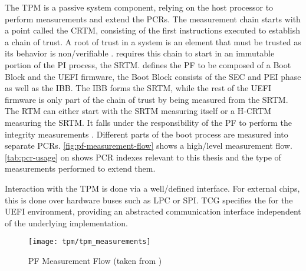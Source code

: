 The \ac{TPM} is a passive system component, relying on the host processor to perform measurements and extend the \acp{PCR}.
The measurement chain starts with a point called the \ac{CRTM}, consisting of the first instructions executed to establish a chain of trust.
A root of trust in a system is an element that must be trusted as its behavior is non\-/verifiable \cite{tcg-tpm-library-part1-architecture}.
\cite[3.2.2]{tcg-pc-client-platform-firmware-profile-spec} requires this chain to start in an immutable portion of the \ac{PI} process, the \ac{SRTM}.
\cite[3.2.3.1]{tcg-pc-client-platform-firmware-profile-spec} defines the \ac{PF} to be composed of a Boot Block and the \ac{UEFI} firmware, the Boot Block consists of the \ac{SEC} and \ac{PEI} phase as well as the \ac{IBB}.
The \ac{IBB} forms the \ac{SRTM}, while the rest of the \ac{UEFI} firmware is only part of the chain of trust by being measured from the \ac{SRTM}.
The \ac{RTM} can either start with the \ac{SRTM} measuring itself or a \ac{H-CRTM} measuring the \ac{SRTM}.
It falls under the responsibility of the \ac{PF} to perform the integrity measurements \cite{tcg-pc-client-platform-firmware-profile-spec}.
Different parts of the boot process are measured into separate \acp{PCR}.
\autoref{fig:pf-measurement-flow} shows a high\-/level measurement flow.
\autoref{tab:pcr-usage} on \pageref{tab:pcr-usage} shows \ac{PCR} indexes relevant to this thesis and the type of measurements performed to extend them.

Interaction with the \ac{TPM} is done via a well\-/defined interface.
For external chips, this is done over hardware buses such as \ac{LPC} or \ac{SPI}.
\ac{TCG} specifies the  for the \ac{UEFI} environment, providing an abstracted communication interface independent of the underlying implementation.

\begin{figure}[htb]
    \centering
    \texttt{[image: tpm/tpm\_measurements]}
    \caption[\acs{PF} Measurement Flow]{\acs{PF} Measurement Flow (taken from \cite[Figure 3]{tianocore-trusted-boot-chain})}
    \label{fig:pf-measurement-flow}
\end{figure}

